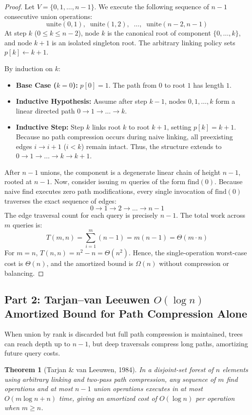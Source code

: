 \documentclass[11pt,a4paper]{article}
\newtheorem{theorem}{Theorem}
\begin{document}
\begin{proof}
Let $V = \{0, 1, \dots, n-1\}$. We execute the following sequence of $n-1$ consecutive union operations:
\[
\text{unite}(0, 1), \;\; \text{unite}(1, 2), \;\; \dots, \;\; \text{unite}(n-2, n-1)
\]
At step $k$ ($0 \le k \le n-2$), node $k$ is the canonical root of component $\{0, \dots, k\}$, and node $k+1$ is an isolated singleton root. The arbitrary linking policy sets $p[k] \leftarrow k+1$.

By induction on $k$:
\begin{itemize}
    \item \textbf{Base Case ($k=0$):} $p[0] = 1$. The path from $0$ to root $1$ has length $1$.
    \item \textbf{Inductive Hypothesis:} Assume after step $k-1$, nodes $0, 1, \dots, k$ form a linear directed path $0 \to 1 \to \dots \to k$.
    \item \textbf{Inductive Step:} Step $k$ links root $k$ to root $k+1$, setting $p[k] = k+1$. Because no path compression occurs during naive linking, all preexisting edges $i \to i+1$ ($i < k$) remain intact. Thus, the structure extends to $0 \to 1 \to \dots \to k \to k+1$.
\end{itemize}
After $n-1$ unions, the component is a degenerate linear chain of height $n-1$, rooted at $n-1$.
Now, consider issuing $m$ queries of the form $\text{find}(0)$. Because naive find executes zero path modifications, every single invocation of $\text{find}(0)$ traverses the exact sequence of edges:
\[
0 \to 1 \to 2 \to \dots \to n-1
\]
The edge traversal count for each query is precisely $n-1$. The total work across $m$ queries is:
\[
T(m, n) = \sum_{i=1}^m (n - 1) = m(n - 1) = \Theta(m \cdot n)
\]
For $m = n$, $T(n, n) = n^2 - n = \Theta(n^2)$. Hence, the single-operation worst-case cost is $\Theta(n)$, and the amortized bound is $\Omega(n)$ without compression or balancing.
\end{proof}

\subsection{Part 2: Tarjan--van Leeuwen $O(\log n)$ Amortized Bound for Path Compression Alone}
When union by rank is discarded but full path compression is maintained, trees can reach depth up to $n-1$, but deep traversals compress long paths, amortizing future query costs.

\begin{theorem}[Tarjan \& van Leeuwen, 1984]
In a disjoint-set forest of $n$ elements using arbitrary linking and two-pass path compression, any sequence of $m$ find operations and at most $n-1$ union operations executes in at most $O(m \log n + n)$ time, giving an amortized cost of $O(\log n)$ per operation when $m \ge n$.
\end{theorem}
\end{document}
